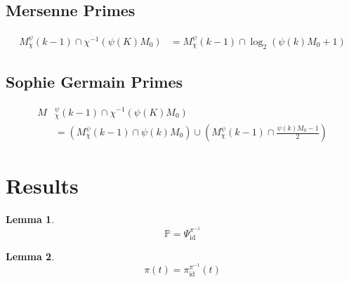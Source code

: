\documentclass{article}
\newcommand{\inv}{^{-1}}
\DeclareMathOperator{\id}{id}
\newtheorem{lemma}{Lemma}
\begin{document}
	\subsection{Mersenne Primes}
	
	\begin{equation}
		\begin{split}
			M_χ^ψ(k-1) \cap χ\inv\left( ψ(K)M_0 \right) &= M_χ^ψ(k-1) \cap \log_2(ψ(k)M_0 + 1)
		\end{split}
	\end{equation}
	
	\subsection{Sophie Germain Primes}
	
	\begin{equation}
		\begin{split}
			M&_χ^ψ(k-1) \cap χ\inv\left( ψ(K)M_0 \right) \\
			&= (M_χ^ψ(k-1) \cap ψ(k)M_0) \cup (M_χ^ψ(k-1) \cap \frac{ψ(k)M_0 - 1}{2})
		\end{split}
	\end{equation}
	
	\section{Results}

	
	\begin{lemma}
		\begin{equation}
			\mathbb{P} = Ψ_{\id}^{π\inv}
		\end{equation}
	\end{lemma}
	
	\begin{lemma}
		\begin{equation}
			π(t) = π_{\id}^{π\inv}(t)
		\end{equation}
	\end{lemma}
\end{document}
